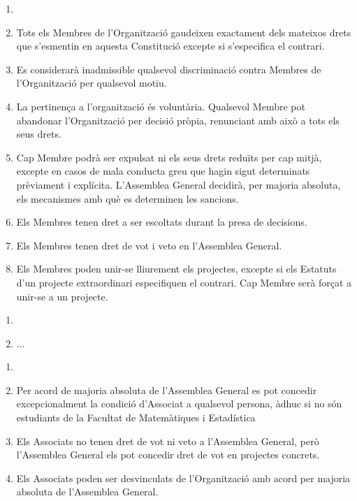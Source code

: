 \documentclass[12pt]{article}
\begin{document}
\begin{art}
    \begin{enumerate}[1.]
        \item[]
        \item Tots els Membres de l'Organització gaudeixen exactament dels mateixos drets que s'esmentin en aquesta Constitució excepte si s'especifica el contrari.
        \item Es considerarà inadmissible qualsevol discriminació contra Membres de l'Organització per qualsevol motiu.
        \item La pertinença a l'organització és voluntària. Qualsevol Membre pot abandonar l'Organització per decisió pròpia, renunciant amb això a tots els seus drets.
        \item Cap Membre podrà ser expulsat ni els seus drets reduïts per cap mitjà, excepte en casos de mala conducta greu que hagin sigut determinats prèviament i explícita. L'Assemblea General decidirà, per majoria absoluta, els mecanismes amb què es determinen les sancions.
        \item Els Membres tenen dret a ser escoltats durant la presa de decisions.
        \item Els Membres tenen dret de vot i veto en l'Assemblea General.
        \item Els Membres poden unir-se lliurement els projectes, excepte si els Estatuts d'un projecte extraordinari especifiquen el contrari. Cap Membre serà forçat a unir-se a un projecte.
    \end{enumerate}
\end{art}

\begin{art}
    \begin{enumerate}[1.]
        \item[]
        \item ... %
    \end{enumerate}
\end{art}

\begin{art}
    \begin{enumerate}[1.]
        \item[]
        \item Per acord de majoria absoluta de l'Assemblea General es pot concedir excepcionalment la condició d'Associat a qualsevol persona, àdhuc si no són estudiants de la Facultat de Matemàtiques i Estadística
        \item Els Associats no tenen dret de vot ni veto a l'Assemblea General, però l'Assemblea General els pot concedir dret de vot en projectes concrets.
        \item Els Associats poden ser desvinculats de l'Organització amb acord per majoria absoluta de l'Assemblea General.
    \end{enumerate}
\end{art}
\end{document}
